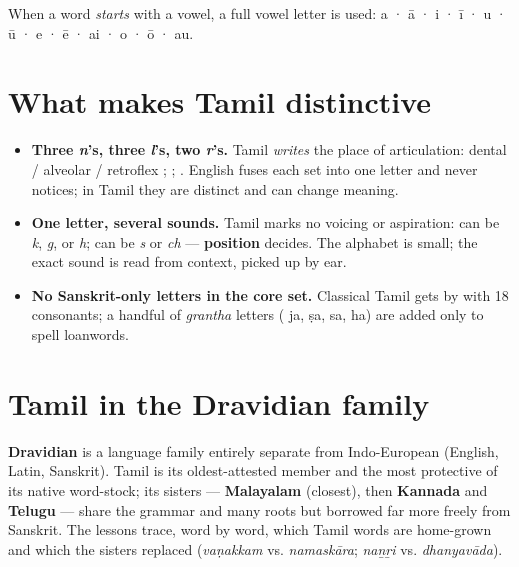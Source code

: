 When a word \emph{starts} with a vowel, a full vowel letter is used: \textbf{} a · \textbf{} ā · \textbf{} i · \textbf{} ī · \textbf{} u · \textbf{} ū · \textbf{} e · \textbf{} ē · \textbf{} ai · \textbf{} o · \textbf{} ō · \textbf{} au.

\section*{What makes Tamil distinctive}

\begin{itemize}
\raggedright
\setlength{\itemsep}{0.35em}
  \item \textbf{Three \emph{n}'s, three \emph{l}'s, two \emph{r}'s.} Tamil \emph{writes} the place of articulation: dental \textbf{} / alveolar \textbf{} / retroflex \textbf{}; \textbf{  }; \textbf{ }. English fuses each set into one letter and never notices; in Tamil they are distinct and can change meaning.
  \item \textbf{One letter, several sounds.} Tamil marks no voicing or aspiration: \textbf{} can be \emph{k}, \emph{g}, or \emph{h}; \textbf{} can be \emph{s} or \emph{ch} — \textbf{position} decides. The alphabet is small; the exact sound is read from context, picked up by ear.
  \item \textbf{No Sanskrit-only letters in the core set.} Classical Tamil gets by with 18 consonants; a handful of \emph{grantha} letters (\textbf{} ja, \textbf{} ṣa, \textbf{} sa, \textbf{} ha) are added only to spell loanwords.
\end{itemize}

\section*{Tamil in the Dravidian family}

\textbf{Dravidian} is a language family entirely separate from Indo-European (English, Latin, Sanskrit). Tamil is its oldest-attested member and the most protective of its native word-stock; its sisters — \textbf{Malayalam} (closest), then \textbf{Kannada} and \textbf{Telugu} — share the grammar and many roots but borrowed far more freely from Sanskrit. The lessons trace, word by word, which Tamil words are home-grown and which the sisters replaced (\emph{vaṇakkam} vs. \emph{namaskāra}; \emph{naṉṟi} vs. \emph{dhanyavāda}).

